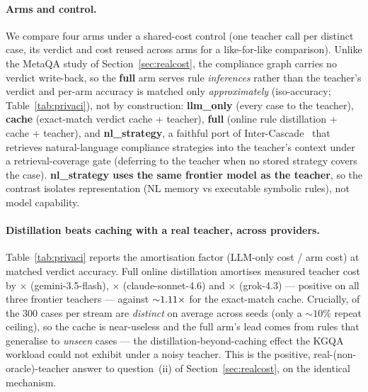 \documentclass[11pt]{article}
\theoremstyle{plain}
\begin{document}
\paragraph{Arms and control.} We compare four arms under a shared-cost
control (one teacher call per distinct case, its verdict and cost reused across
arms for a like-for-like comparison). Unlike the MetaQA study of
Section~\ref{sec:realcost}, the compliance graph carries no verdict write-back,
so the \textbf{full} arm serves rule \emph{inferences} rather than the teacher's
verdict and per-arm accuracy is matched only \emph{approximately}
(iso-accuracy; Table~\ref{tab:privaci}), not by construction: \textbf{llm\_only}
(every case to the teacher),
\textbf{cache} (exact-match verdict cache + teacher), \textbf{full} (online
rule distillation + cache + teacher), and \textbf{nl\_strategy}, a faithful
port of Inter-Cascade~\citep{intercascade2025} that retrieves
natural-language compliance strategies into the teacher's context under a
retrieval-coverage gate (deferring to the teacher when no stored strategy
covers the case). \textbf{nl\_strategy uses the same frontier model as the
teacher}, so the contrast isolates representation (NL memory vs executable
symbolic rules), not model capability.



\paragraph{Distillation beats caching with a real teacher, across providers.}
Table~\ref{tab:privaci} reports the amortisation factor (LLM-only cost /
arm cost) at matched verdict accuracy. Full online distillation amortises
measured teacher cost by \privFullGemini$\times$ (gemini-3.5-flash),
\privFullClaude$\times$ (claude-sonnet-4.6) and \privFullGrok$\times$
(grok-4.3) --- positive on all three frontier teachers --- against
${\sim}1.11\times$ for the exact-match cache. Crucially, of the
$300$ cases per stream \privDistinct{} are \emph{distinct} on average across
seeds (only a ${\sim}10\%$ repeat ceiling), so the cache is near-useless and the full arm's
lead comes from rules that generalise to \emph{unseen} cases --- the
distillation-beyond-caching effect the KGQA workload could not exhibit under
a noisy teacher. This is the positive, real-(non-oracle)-teacher answer to
question~(ii) of Section~\ref{sec:realcost}, on the identical mechanism.
\end{document}
